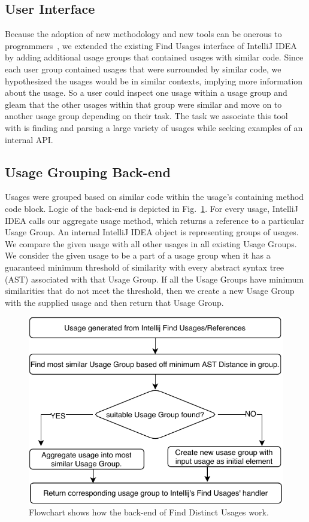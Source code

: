 \documentclass[conference]{IEEEtran}
\begin{document}
\subsection{User Interface} 

Because the adoption of new methodology and new tools can be onerous to programmers~\cite{adaption2002}, we extended the existing Find Usages interface of IntelliJ IDEA by adding additional usage groups that contained usages with similar code. Since each user group contained usages that were surrounded by similar code, we hypothesized the usages would be in similar contexts, implying more information about the usage. So a user could inspect one usage within a usage group and gleam that the other usages within that group were similar and move on to another usage group depending on their task. The task we associate this tool with is finding and parsing a large variety of usages while seeking examples of an internal API.

\subsection{Usage Grouping Back-end} 
Usages were grouped based on similar code within the usage's containing method code block. Logic of the back-end is depicted in Fig.~\ref{fig:flowchart}. For every usage, IntelliJ IDEA calls our aggregate usage method, which returns a reference to a particular Usage Group. An internal IntelliJ IDEA object is representing groups of usages. We compare the given usage with all other usages in all existing Usage Groups. We consider the given usage to be a part of a usage group when it has a guaranteed minimum threshold of similarity with every abstract syntax tree (AST)  associated with that Usage Group. If all the Usage Groups have minimum similarities that do not meet the threshold, then we create a new Usage Group with the supplied usage and then return that Usage Group. \par
\begin{figure}
    \centering
    \includegraphics [width=\columnwidth,keepaspectratio, clip]{figures/flowchart}
    \caption{Flowchart shows how the back-end of Find Distinct Usages work. }
\label{fig:flowchart}
\end{figure}
\end{document}
